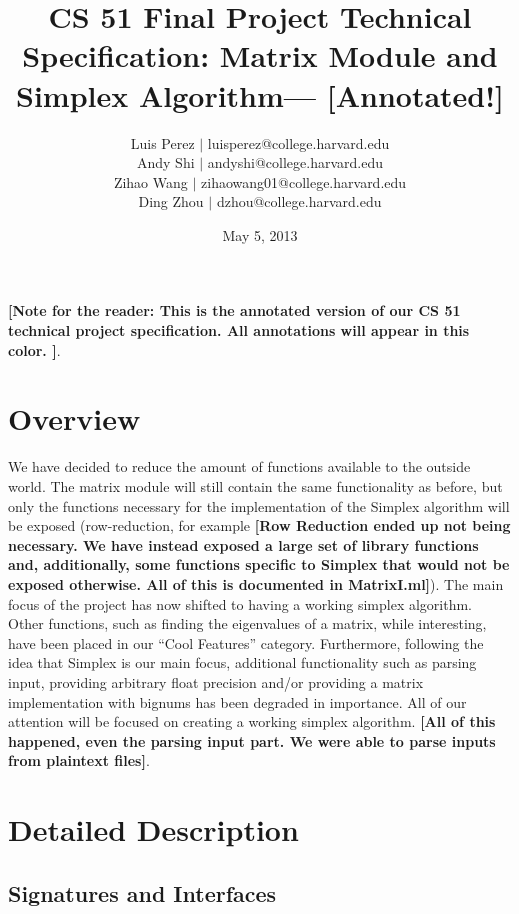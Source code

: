 \documentclass[letterpaper,11pt]{article}
\newcommand{\annot}[1]{\textbf{\color{BrickRed} [#1]}}
\begin{document}
\title{CS 51 Final Project Technical Specification: Matrix Module and Simplex Algorithm---{\annot{Annotated!}}}
\author{
Luis Perez $|$ luisperez@college.harvard.edu \\ 
Andy Shi $|$ andyshi@college.harvard.edu \\ 
Zihao Wang $|$ zihaowang01@college.harvard.edu \\ 
Ding Zhou $|$ dzhou@college.harvard.edu
}
\date{May 5, 2013}
\maketitle

{\annot{Note for the reader: This is the annotated version of our CS 51 
technical project specification. All annotations will appear in this color. }}.

\section{Overview}

We have decided to reduce the amount of functions available to the outside
world. The matrix module will still contain the same functionality as before,
but only the functions necessary for the implementation of the Simplex algorithm
will be exposed (row-reduction, for example{\annot{Row Reduction ended up not
being necessary. We have instead exposed a large set of library functions and,
additionally, some functions specific to Simplex that would not be exposed otherwise.
All of this is documented in MatrixI.ml}}). The main focus of the project has
now shifted to having a working simplex algorithm. Other functions, such as
finding the eigenvalues of a matrix, while interesting, have been placed in our
“Cool Features” category. Furthermore, following the idea that Simplex is our
main focus, additional functionality such as parsing input, providing arbitrary
float precision and/or providing a matrix implementation with bignums has been
degraded in importance. All of our attention will be focused on creating a
working simplex algorithm. {\annot{All of this happened, even the parsing input part. 
We were able to parse inputs from plaintext files}}.

\section{Detailed Description}
\subsection{Signatures and Interfaces}
\end{document}
